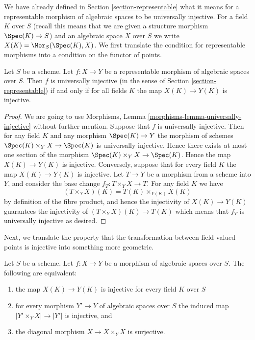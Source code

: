 \noindent
We have already defined in Section \ref{section-representable}
what it means for a representable morphism of algebraic spaces
to be universally injective. For a field $K$ over $S$ (recall this means that
we are given a structure morphism $\Spec(K) \to S$) and an
algebraic space $X$ over $S$ we write
$X(K) = \Mor_S(\Spec(K), X)$. We first translate the
condition for representable morphisms into a condition on the functor
of points.

\begin{lemma}
\label{lemma-universally-injective-representable}
Let $S$ be a scheme. Let $f : X \to Y$ be a representable
morphism of algebraic spaces over $S$. Then $f$ is universally injective
(in the sense of Section \ref{section-representable})
if and only if for all fields $K$ the map $X(K) \to Y(K)$ is injective.
\end{lemma}

\begin{proof}
We are going to use
Morphisms, Lemma \ref{morphisms-lemma-universally-injective}
without further mention.
Suppose that $f$ is universally injective. Then for any field $K$ and any
morphism $\Spec(K) \to Y$ the morphism of schemes
$\Spec(K) \times_Y X \to \Spec(K)$ is universally injective.
Hence there exists at most one section of the morphism
$\Spec(K) \times_Y X \to \Spec(K)$. Hence the map
$X(K) \to Y(K)$ is injective. Conversely, suppose that for every field $K$
the map $X(K) \to Y(K)$ is injective. Let $T \to Y$ be a morphism from a
scheme into $Y$, and consider the base change $f_T : T \times_Y X \to T$.
For any field $K$ we have
$$
(T \times_Y X)(K) = T(K) \times_{Y(K)} X(K)
$$
by definition of the fibre product, and hence the injectivity of
$X(K) \to Y(K)$ guarantees the injectivity of
$(T \times_Y X)(K) \to T(K)$ which means that $f_T$ is universally injective
as desired.
\end{proof}

\noindent
Next, we translate the property that the transformation between field valued
points is injective into something more geometric.

\begin{lemma}
\label{lemma-universally-injective}
Let $S$ be a scheme.
Let $f : X \to Y$ be a morphism of algebraic spaces over $S$.
The following are equivalent:
\begin{enumerate}
\item the map $X(K) \to Y(K)$ is injective for every field $K$ over $S$
\item for every morphism $Y' \to Y$ of algebraic spaces over $S$
the induced map $|Y' \times_Y X| \to |Y'|$ is injective, and
\item the diagonal morphism $X \to X \times_Y X$ is surjective.
\end{enumerate}
\end{lemma}

